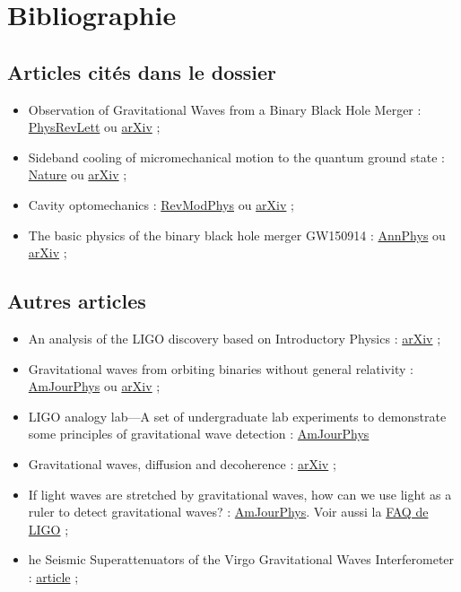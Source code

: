 \documentclass[12pt,a4paper]{article}
\begin{document}
\section*{Bibliographie}

\subsection*{Articles cités dans le dossier}

\begin{itemize}
\item Observation of Gravitational Waves from a Binary Black Hole Merger : \href{https://journals.aps.org/prl/abstract/10.1103/PhysRevLett.116.061102}{PhysRevLett} ou \href{https://arxiv.org/abs/1602.03837}{arXiv} ;
\item Sideband cooling of micromechanical motion to the quantum ground state : \href{https://www.nature.com/articles/nature10261}{Nature} ou \href{https://arxiv.org/abs/1103.2144}{arXiv} ;
\item Cavity optomechanics : \href{https://journals.aps.org/rmp/abstract/10.1103/RevModPhys.86.1391}{RevModPhys} ou \href{https://arxiv.org/abs/1303.0733}{arXiv} ;
\item The basic physics of the binary black hole merger GW150914 : \href{https://onlinelibrary.wiley.com/doi/10.1002/andp.201600209}{AnnPhys} ou \href{https://arxiv.org/abs/1608.01940}{arXiv} ;
\end{itemize}

\subsection*{Autres articles}

\begin{itemize}
\item An analysis of the LIGO discovery based on Introductory Physics : \href{https://arxiv.org/abs/1609.09349}{arXiv} ;
\item Gravitational waves from orbiting binaries without general relativity : \href{https://aapt.scitation.org/doi/10.1119/1.5020984}{AmJourPhys} ou \href{https://arxiv.org/abs/1710.04635}{arXiv} ;
\item LIGO analogy lab—A set of undergraduate lab experiments to demonstrate some principles of gravitational wave detection : \href{https://aapt.scitation.org/doi/10.1119/1.5066567}{AmJourPhys}
\item Gravitational waves, diffusion and decoherence : \href{https://arxiv.org/abs/0801.3411}{arXiv} ;
\item If light waves are stretched by gravitational waves, how can we use light as a ruler to detect gravitational waves? : \href{https://aapt.scitation.org/doi/10.1119/1.18578}{AmJourPhys}.
Voir aussi la \href{https://www.ligo.caltech.edu/page/faq}{FAQ de LIGO} ;
\item he Seismic Superattenuators of the Virgo Gravitational Waves Interferometer : \href{https://journals.sagepub.com/doi/10.1260/0263-0923.30.1.63}{article} ;
\end{itemize}
\end{document}
